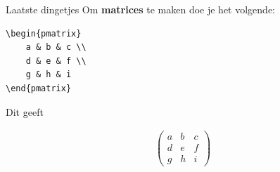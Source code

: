 \begin{frame}[fragile]{Laatste dingetjes}
Om \textbf{matrices} te maken doe je het volgende: 
\pause
\begin{verbatim}
\begin{pmatrix}
    a & b & c \\
    d & e & f \\
    g & h & i
\end{pmatrix}
\end{verbatim}
\pause
Dit geeft 
\begin{tcolorbox}[boxrule=0.5pt, colback=white]
    \begin{align*}
    \begin{pmatrix}
    a & b & c \\
    d & e & f \\
    g & h & i
    \end{pmatrix}
    \end{align*}
\end{tcolorbox}

\end{frame}